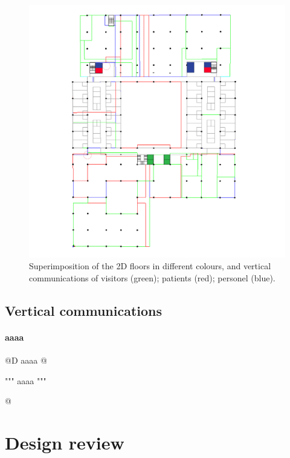 \documentclass[11pt,oneside]{article}    %
\begin{document}
\begin{figure}[htbp] %
   \centering
   \includegraphics[width=\linewidth]{images/planupdate} 
   \caption{Superimposition of the 2D floors in different colours, and vertical communications of visitors (green); patients (red); personel (blue).}
   \label{fig:example}
\end{figure}


\subsection{Vertical communications}


\paragraph{aaaa}
@D aaaa
@{""" aaaa """

@}

\section{Design review}
\end{document}
